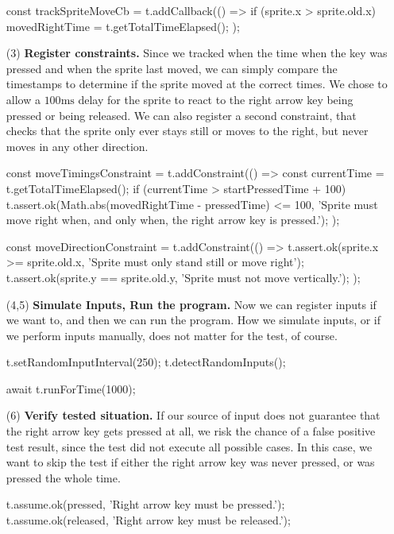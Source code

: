 \begin{enumerate}
\begin{javascriptcode}
            const trackSpriteMoveCb = t.addCallback(() => {
                if (sprite.x > sprite.old.x) {
                    movedRightTime = t.getTotalTimeElapsed();
                }
            });
        \end{javascriptcode}
    \item[(3)] \textbf{Register constraints.}
        Since we tracked when the time when the key was pressed and when the sprite last moved,
        we can simply compare the timestamps to determine if the sprite moved at the correct times.
        We chose to allow a $100 \text{ms}$ delay for the sprite to react to the right arrow key being pressed or being released.
        We can also register a second constraint, that checks that the sprite only ever stays still or moves to the right,
        but never moves in any other direction.
        \begin{javascriptcode}
            const moveTimingsConstraint = t.addConstraint(() => {
                const currentTime = t.getTotalTimeElapsed();
                if (currentTime > startPressedTime + 100) {
                    t.assert.ok(Math.abs(movedRightTime - pressedTime) <= 100,
                        'Sprite must move right when, and only when, the right arrow key is pressed.');
                }
            });

            const moveDirectionConstraint = t.addConstraint(() => {
                t.assert.ok(sprite.x >= sprite.old.x,
                    'Sprite must only stand still or move right');
                t.assert.ok(sprite.y == sprite.old.y,
                    'Sprite must not move vertically.');
            });
        \end{javascriptcode}
    \item[(4,5)] \textbf{Simulate Inputs, Run the program.}
        Now we can register inputs if we want to, and then we can run the program.
        How we simulate inputs, or if we perform inputs manually, does not matter for the test, of course.
        \begin{javascriptcode}
            t.setRandomInputInterval(250);
            t.detectRandomInputs();

            await t.runForTime(1000);
        \end{javascriptcode}
    \item[(6)] \textbf{Verify tested situation.}
        If our source of input does not guarantee that the right arrow key gets pressed at all, we risk the chance of a false positive test result,
        since the test did not execute all possible cases.
        In this case, we want to skip the test if either the right arrow key was never pressed,
        or was pressed the whole time.
        \begin{javascriptcode}
            t.assume.ok(pressed, 'Right arrow key must be pressed.');
            t.assume.ok(released, 'Right arrow key must be released.');
        \end{javascriptcode}
\end{enumerate}

